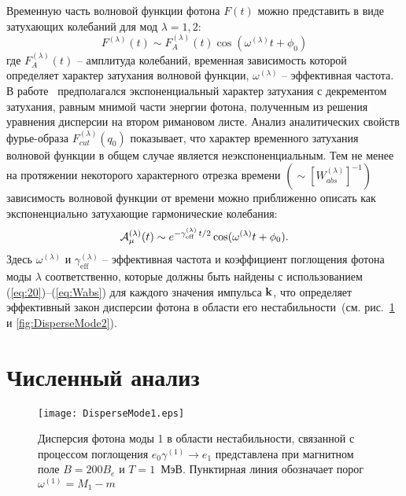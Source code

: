 Временную часть волновой функции фотона $F(t)$ можно представить в виде затухающих колебаний для мод $\lambda=1,2$:
\begin{equation}\label{eq:Fm}
	F^{(\lambda)}(t)\sim F^{(\lambda)}_A(t) \cos(\omega^{(\lambda)} t+\phi_0)
\end{equation}
где $F^{(\lambda)}_A(t)$ -- амплитуда колебаний,
временная зависимость которой определяет
характер затухания волновой функции,
$\omega^{(\lambda)}$ -- эффективная
частота. В работе~\cite{Shabad:1988}
предполагался экспоненциальный характер затухания с декрементом затухания, равным мнимой части энергии фотона, полученным из решения уравнения дисперсии на втором римановом листе. Анализ  аналитических свойств фурье-образа $F^{(\lambda)}_{cut}(q_0)$ показывает, что характер временного затухания волновой функции в общем случае является неэкспоненциальным. Тем не менее на протяжении некоторого характерного отрезка времени $(\sim [W^{(\lambda)}_{abs}]^{-1})$
зависимость волновой функции от времени можно приближенно описать как 
экспоненциально затухающие гармонические колебания:
%
\begin{equation}\label{eq:ApproxA}
{\cal A}^{(\lambda)}_\mu(t) \sim e^{- \gamma^{(\lambda)}_\text{eff} \, t/2} \cos 
(\omega^{(\lambda)} t + \phi_0).
\end{equation}
%
Здесь $\omega^{(\lambda)}$ и $\gamma^{(\lambda)}_\text{eff}$ -- эффективная 
частота и коэффициент  
поглощения фотона моды $\lambda$ соответственно, которые должны быть найдены с использованием 
(\ref{eq:20})--(\ref{eq:Wabs}) для каждого значения импульса ${\bf k}$, что определяет эффективный 
закон дисперсии фотона в области его нестабильности~(см. рис.~\ref{fig:DisperseMode1} и \ref{fig:DisperseMode2}).


\section{Численный анализ}



\begin{figure}[t]\centering
	\texttt{[image: DisperseMode1.eps]}
	\caption{Дисперсия фотона моды 1 в области нестабильности, связанной с процессом поглощения $e_0 \gamma^{(1)}\to e_1$ представлена при магнитном поле $B=200B_e$ и $T=1$~МэВ. Пунктирная линия обозначает порог $\omega^{(1)}=M_1-m$ \label{fig:DisperseMode1}}
\end{figure}

